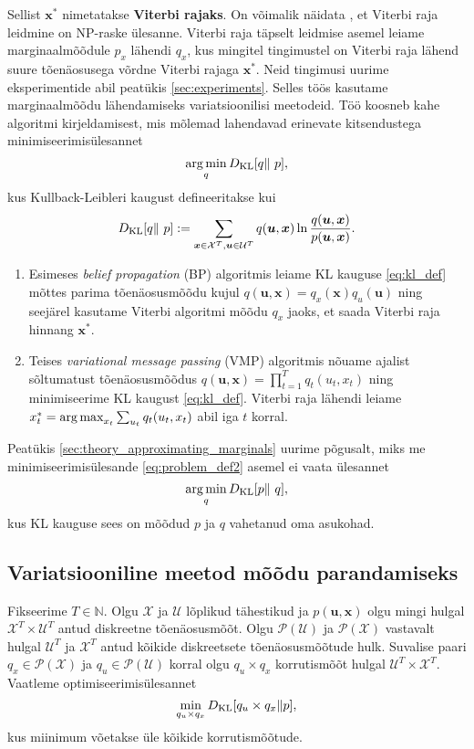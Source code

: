 Sellist $\mathbf{x}^*$ nimetatakse \textbf{Viterbi rajaks}. On võimalik näidata \parencite{LYNGSO2002545}, et Viterbi raja leidmine on NP-raske ülesanne. Viterbi raja täpselt leidmise asemel leiame marginaalmõõdule $p_x$ lähendi $q_x$, kus mingitel tingimustel on Viterbi raja lähend suure tõenäosusega võrdne Viterbi rajaga $\bm{x}^*$. Neid tingimusi uurime eksperimentide abil peatükis \ref{sec:experiments}. Selles töös kasutame marginaalmõõdu lähendamiseks variatsioonilisi meetodeid. Töö koosneb kahe algoritmi kirjeldamisest, mis mõlemad lahendavad erinevate kitsendustega minimiseerimisülesannet
\begin{equation}
    \label{eq:problem_def2}
    \operatorname*{arg\,min}_{q} D_{\mathrm{KL}}[q \|\ p],
\end{equation}
kus Kullback-Leibleri kaugust defineeritakse kui
\begin{equation}
    \label{eq:kl_def}
    D_{\mathrm{KL}}[q \|\ p] := \sum_{\bm{x} \in \mathcal{X}^T, \bm{u} \in \mathcal{U}^T} q(\bm{u}, \bm{x}) \ln \frac{q(\bm{u}, \bm{x})}{p(\bm{u}, \bm{x})}.
\end{equation}

\begin{enumerate}
    \item Esimeses \emph{belief propagation} (BP) algoritmis leiame KL kauguse \eqref{eq:kl_def} mõttes parima tõenäosusmõõdu kujul $q(\bm{u}, \bm{x}) = q_x(\bm{x})q_u(\bm{u})$ ning seejärel kasutame Viterbi algoritmi mõõdu $q_x$ jaoks, et saada Viterbi raja hinnang $\bm{x}^*$.
    \item Teises \emph{variational message passing} (VMP) algoritmis nõuame ajalist sõltumatust tõenäosusmõõdus $q(\bm{u}, \bm{x}) = \prod_{t=1}^T q_t(u_t,x_t)$ ning minimiseerime KL kaugust \eqref{eq:kl_def}. Viterbi raja lähendi leiame $x_t^* = \operatorname*{arg\,max}_{x_t} \sum_{u_t} q_t(u_t,x_t)$ abil iga $t$ korral.
\end{enumerate}

Peatükis \ref{sec:theory_approximating_marginals} uurime põgusalt, miks me minimiseerimisülesande \eqref{eq:problem_def2} asemel ei vaata ülesannet
\[
\argmin_{q} \DKL[p \|\ q],
\]
kus KL kauguse sees on mõõdud $p$ ja $q$ vahetanud oma asukohad.

\subsection{Variatsiooniline meetod mõõdu parandamiseks}\label{sec:theory_variational_method}

Fikseerime $T \in \mathbb{N}$. Olgu $\mathcal{X}$ ja $\mathcal{U}$ lõplikud tähestikud ja $p(\bm{u},\bm{x})$ olgu mingi hulgal $\mathcal{X}^T \times \mathcal{U}^T$ antud diskreetne tõenäosusmõõt. Olgu $\mathcal{P}(\mathcal{U})$ ja $\mathcal{P}(\mathcal{X})$ vastavalt hulgal $\mathcal{U}^T$ ja $\mathcal{X}^T$ antud kõikide diskreetsete tõenäosusmõõtude hulk. Suvalise paari $q_x \in \mathcal{P}(\mathcal{X})$ ja $q_u \in \mathcal{P}(\mathcal{U})$ korral olgu $q_u \times q_x$ korrutismõõt hulgal $\mathcal{U}^T \times \mathcal{X}^T$. Vaatleme optimiseerimisülesannet
\begin{equation}
    \label{eq:problem}
    \min_{q_u \times q_x} D_{\mathrm{KL}}[q_u \times q_x \| p],
\end{equation}
kus miinimum võetakse üle kõikide korrutismõõtude.

